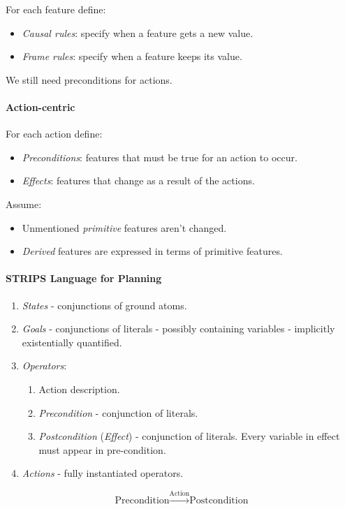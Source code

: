 \documentclass[twocolumn,english]{article}
\begin{document}
For each feature define:
\begin{itemize}
\item \emph{Causal rules}: specify when a feature gets a new value.
\item \emph{Frame rules}: specify when a feature keeps its value.
\end{itemize}
We still need preconditions for actions.

\paragraph{Action-centric}

For each action define:
\begin{itemize}
\item \emph{Preconditions}: features that must be true for an action to
occur.
\item \emph{Effects}: features that change as a result of the actions.
\end{itemize}
Assume:
\begin{itemize}
\item Unmentioned \emph{primitive} features aren't changed.
\item \emph{Derived} features are expressed in terms of primitive features.
\end{itemize}

\paragraph{STRIPS Language for Planning}
\begin{enumerate}
\item \emph{States} - conjunctions of ground atoms.
\item \emph{Goals} - conjunctions of literals - possibly containing variables
- implicitly existentially quantified.
\item \emph{Operators}:
\begin{enumerate}
\item Action description.
\item \emph{Precondition} - conjunction of literals.
\item \emph{Postcondition} (\emph{Effect}) - conjunction of literals. Every
variable in effect must appear in pre-condition.
\end{enumerate}
\item \emph{Actions} - fully instantiated operators.
\end{enumerate}
\[
\text{Precondition}\xrightarrow{\text{Action}}\text{Postcondition}
\]
\end{document}
